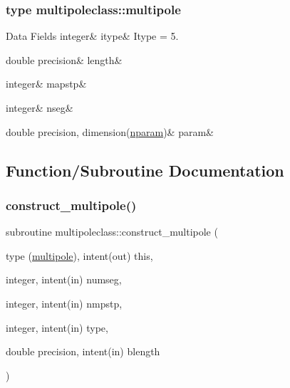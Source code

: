\subsubsection{type multipoleclass\+::multipole}
\begin{DoxyFields}{Data Fields}
\mbox{\label{namespacemultipoleclass_a0819a9c738ccf5ddd0aa69c2a7befd2a}} 
integer&
itype&
Itype = 5. \\
\hline

\mbox{\label{namespacemultipoleclass_aa096a41e77f2a963837b3ec8d5b3324b}} 
double precision&
length&
\\
\hline

\mbox{\label{namespacemultipoleclass_a4d8dd9ec28f1f2396c1fe8634b1ffb81}} 
integer&
mapstp&
\\
\hline

\mbox{\label{namespacemultipoleclass_a7e808e5433de77a1defc9a21691400dc}} 
integer&
nseg&
\\
\hline

\mbox{\label{namespacemultipoleclass_ab06c87e37bb85347c808f7e43bd9bd1f}} 
double precision, dimension(\mbox{\hyperlink{namespacemultipoleclass_a67bb1a71461cf39cdd365adab7fec8b9}{nparam}})&
param&
\\
\hline

\end{DoxyFields}


\subsection{Function/\+Subroutine Documentation}
\mbox{\label{namespacemultipoleclass_acce84c33b6ef25e4e2ee0572faa92b60}} 
\subsubsection{\texorpdfstring{construct\_multipole()}{construct\_multipole()}}
{\footnotesize\ttfamily subroutine multipoleclass\+::construct\+\_\+multipole (\begin{DoxyParamCaption}\item[{type (\mbox{\hyperlink{namespacemultipoleclass_structmultipoleclass_1_1multipole}{multipole}}), intent(out)}]{this,  }\item[{integer, intent(in)}]{numseg,  }\item[{integer, intent(in)}]{nmpstp,  }\item[{integer, intent(in)}]{type,  }\item[{double precision, intent(in)}]{blength }\end{DoxyParamCaption})}

